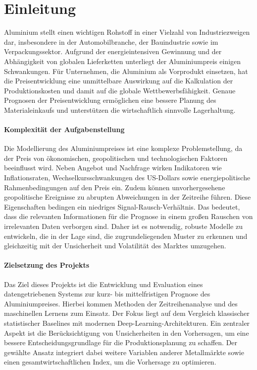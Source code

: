 \section{Einleitung}
\label{sec:einleitung}

Aluminium stellt einen wichtigen Rohstoff in einer Vielzahl von Industriezweigen dar, insbesondere in der Automobilbranche, der Bauindustrie sowie im Verpackungssektor. Aufgrund der energieintensiven Gewinnung und der Abhängigkeit von globalen Lieferketten unterliegt der Aluminiumpreis einigen Schwankungen. Für Unternehmen, die Aluminium als Vorprodukt einsetzen, hat die Preisentwicklung eine unmittelbare Auswirkung auf die Kalkulation der Produktionskosten und damit auf die globale Wettbewerbsfähigkeit. Genaue Prognosen der Preisentwicklung ermöglichen eine bessere Planung des Materialeinkaufs und unterstützen die wirtschaftlich sinnvolle Lagerhaltung.

\paragraph{Komplexität der Aufgabenstellung}
Die Modellierung des Aluminiumpreises ist eine komplexe Problemstellung, da der Preis von ökonomischen, geopolitischen und technologischen Faktoren beeinflusst wird. Neben Angebot und Nachfrage wirken Indikatoren wie Inflationsraten, Wechselkursschwankungen des US-Dollars sowie energiepolitische Rahmenbedingungen auf den Preis ein. Zudem können unvorhergesehene geopolitische Ereignisse zu abrupten Abweichungen in der Zeitreihe führen. Diese Eigenschaften bedingen ein niedriges Signal-Rausch-Verhältnis. Das bedeutet, dass die relevanten Informationen für die Prognose in einem großen Rauschen von irrelevanten Daten verborgen sind. Daher ist es notwendig, robuste Modelle zu entwickeln, die in der Lage sind, die zugrundeliegenden Muster zu erkennen und gleichzeitig mit der Unsicherheit und Volatilität des Marktes umzugehen.

\paragraph{Zielsetzung des Projekts}
Das Ziel dieses Projekts ist die Entwicklung und Evaluation eines datengetriebenen Systems zur kurz- bis mittelfristigen Prognose des Aluminiumpreises. Hierbei kommen Methoden der Zeitreihenanalyse und des maschinellen Lernens zum Einsatz. Der Fokus liegt auf dem Vergleich klassischer statistischer Baselines mit modernen Deep-Learning-Architekturen. Ein zentraler Aspekt ist die Berücksichtigung von Unsicherheiten in den Vorhersagen, um eine bessere Entscheidungsgrundlage für die Produktionsplanung zu schaffen. Der gewählte Ansatz integriert dabei weitere Variablen anderer Metallmärkte sowie einen gesamtwirtschaftlichen Index, um die Vorhersage zu optimieren.